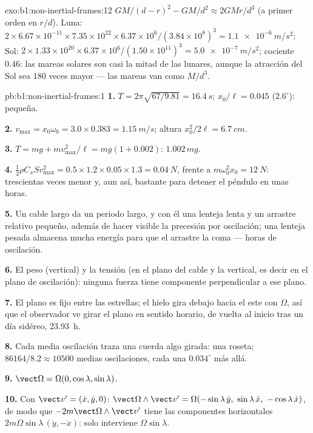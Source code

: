 \begin{solution}{exo:b1:non-inertial-frames:12}
$GM/(d - r)^2 - GM/d^2 \approx 2GMr/d^3$ (a primer orden en $r/d$). Luna:
$2 \times 6.67\times10^{-11} \times 7.35\times10^{22} \times 6.37\times10^6/
(3.84\times10^8)^3 = \qty{1.1e-6}{m/s^2}$; Sol: $2 \times 1.33\times10^{20}
\times 6.37\times10^6/(1.50\times10^{11})^3 = \qty{5.0e-7}{m/s^2}$; cociente
$0.46$: las mareas solares son casi la mitad de las lunares, aunque la
atracción del Sol sea $180$ veces mayor --- las mareas van como $M/d^3$.
\end{solution}

\begin{solution}{pb:b1:non-inertial-frames:1}
\textbf{1.} $T = 2\pi\sqrt{67/9.81} = \qty{16.4}{s}$; $x_0/\ell = 0.045$
($2.6^\circ$): pequeña.

\textbf{2.} $v_{\max} = x_0\omega_0 = 3.0 \times 0.383 = \qty{1.15}{m/s}$; altura
$x_0^2/2\ell = \qty{6.7}{cm}$.

\textbf{3.} $T = mg + mv_{\max}^2/\ell = mg(1 + 0.002)$: $1.002\,mg$.

\textbf{4.} $\tfrac12\rho C_xSv_{\max}^2 = 0.5 \times 1.2 \times 0.05 \times 1.3 =
\qty{0.04}{N}$, frente a $m\omega_0^2x_0 = \qty{12}{N}$: trescientas veces
menor y, aun así, bastante para detener el péndulo en unas horas.

\textbf{5.} Un cable largo da un periodo largo, y con él una lenteja lenta
y un arrastre relativo pequeño, además de hacer visible la precesión por
oscilación; una lenteja pesada almacena mucha energía para que el
arrastre la coma --- horas de oscilación.

\textbf{6.} El peso (vertical) y la tensión (en el plano del cable y la
vertical, es decir en el plano de oscilación): ninguna fuerza tiene
componente perpendicular a ese plano.

\textbf{7.} El plano es fijo entre las estrellas; el hielo gira debajo
hacia el este con $\Omega$, así que el observador ve girar el plano en
sentido horario, de vuelta al inicio tras un día sidéreo, \qty{23.93}{h}.

\textbf{8.} Cada media oscilación traza una cuerda algo girada: una
roseta; $86164/8.2 \approx 10500$ medias oscilaciones, cada una $0.034^\circ$ más allá.

\textbf{9.} $\vect\Omega = \Omega(0, \cos\lambda, \sin\lambda)$.

\textbf{10.} Con $\vect v' = (\dot x, \dot y, 0)$:
$\vect\Omega\wedge\vect v' = \Omega(-\sin\lambda\,\dot y,\ \sin\lambda\,\dot x,\ -\cos\lambda\,\dot x)$,
de modo que $-2m\vect\Omega\wedge\vect v'$ tiene las componentes horizontales
$2m\Omega\sin\lambda\,(\dot y, -\dot x)$: solo interviene $\Omega\sin\lambda$.


\end{solution}
